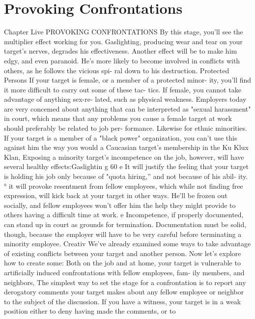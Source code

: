 \documentclass{book}
\begin{document}
\chapter{Provoking Confrontations}
Chapter Live 
PROVOKING 
CONFRONTATIONS 
By this stage, you'll see the multiplier effect working for 
you. Gaslighting, producing wear and tear on your target's 
nerves, degrades his effectiveness. Another effect will be to 
make him edgy, and even paranoid. He's more likely to become 
involved in conflicts with others, as he follows the vicious spi- 
ral down to his destruction. 
Protected Persons 
If your target is female, or a member of a protected minor- 
ity, you'll find it more difficult to carry out some of these tac- 
tics. If female, you cannot take advantage of anything sex-re- 
lated, such as physical weakness. Employers today are very 
concemed about anything that can be interpreted as "sexual 
harassment" in court, which means that any problems you cause 
a female target at work should preferably be related to job per- 
formance. 
Likewise for ethnic minorities. If your target is a member of 
a "black power" organization, you can't use this against him the 
way you would a Caucasian target's membership in the Ku 
Klux Klan, Exposing a minority target's incompetence on the 
job, however, will have several healthy effects:Gaslightin g 
60 
e It will justify the feeling that your target is holding his job 
only because of "quota hiring,” and not because of his abil- 
ity. 
° it will provoke resentment from fellow employees, which 
while not finding free expression, will kick back at your 
target in other ways. He'll be frozen out socially, and fellow 
employees won't offer him the help they might provide to 
others having a difficult time at work. 
e Incompetence, if properly documented, can stand up in 
court as grounds for termination. Documentation must be 
solid, though, because the employer will have to be very 
careful before terminating a minority employee. 
Creativ 
We've already examined some ways to take advantage of 
existing conflicts between your target and another person. Now 
let's explore how to create some: 
Both on the job and at home, your target is vulnerable to 
artificially induced confrontations with fellow employees, fam- 
ily members, and neighbors, The simplest way to set the stage 
for a confrontation is to report any derogatory comments your 
target makes about any fellow employee or neighbor to the 
subject of the discussion. If you have a witness, your target is in 
a weak position either to deny having made the comments, or to 
\end{document}
